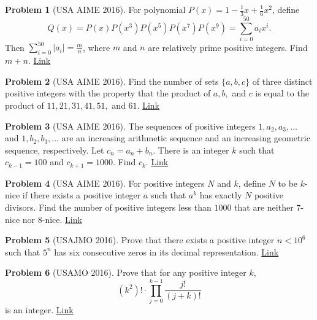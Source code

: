 \documentclass[]{article}
\theoremstyle{definition}
\newtheorem{problem}{Problem}
\begin{document}
\begin{problem}[USA AIME 2016]
	For polynomial $P(x)=1-\frac{1}{3}x+\frac{1}{6}x^2$, define \[ Q(x) = P(x)P(x^3)P(x^5)P(x^7)P(x^9) = \sum\limits_{i=0}^{50}a_ix^i. \]Then $\sum\limits_{i=0}^{50}|a_i|=\frac{m}{n}$, where $m$ and $n$ are relatively prime positive integers. Find $m+n$. \hfill \href{http://artofproblemsolving.com/community/c5h1213127p6023562}{Link}
\end{problem}


\begin{problem}[USA AIME 2016]
	Find the number of sets $\{a,b,c\}$ of three distinct positive integers with the property that the product of $a,b,$ and $c$ is equal to the product of $11,21,31,41,51,$ and $61$. \hfill \href{http://artofproblemsolving.com/community/c5h1213129p6023597}{Link}
\end{problem}


\begin{problem}[USA AIME 2016]
	The sequences of positive integers $1,a_2,a_3,\ldots$ and $1,b_2,b_3,\ldots$ are an increasing arithmetic sequence and an increasing geometric sequence, respectively. Let $c_n=a_n+b_n$. There is an integer $k$ such that $c_{k-1}=100$ and $c_{k+1}=1000$. Find $c_k$. \hfill \href{http://artofproblemsolving.com/community/c5h1213132p6023608}{Link}
\end{problem}



\begin{problem}[USA AIME 2016]
	For positive integers $N$ and $k$, define $N$ to be $k$-nice if there exists a positive integer $a$ such that $a^k$ has exactly $N$ positive divisors. Find the number of positive integers less than $1000$ that are neither $7$-nice nor $8$-nice. \flushright \href{http://artofproblemsolving.com/community/c5h1213134p6023621}{Link}
\end{problem}


\begin{problem}[USAJMO 2016]
	Prove that there exists a positive integer $n < 10^6$ such that $5^n$ has six consecutive zeros in its decimal representation. \hfill \href{http://artofproblemsolving.com/community/c5h1230489p6213569}{Link}
\end{problem}

\begin{problem}[USAMO 2016]
	Prove that for any positive integer $k$, \[(k^2)!\cdot\displaystyle\prod_{j=0}^{k-1}\frac{j!}{(j+k)!}\]is an integer. \hfill \href{http://artofproblemsolving.com/community/c5h1230499p6213627}{Link}
\end{problem}
\end{document}
